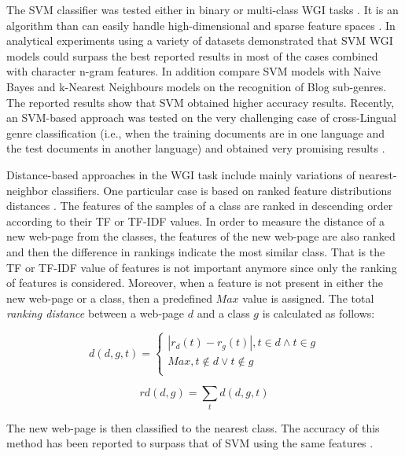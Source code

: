 The SVM classifier was tested either in binary or multi-class WGI tasks \parencite{dai2018fine}. It is an algorithm than can easily handle high-dimensional and sparse feature spaces \parencite{joachims1997probabilistic}. In  analytical experiments using a variety of datasets demonstrated that SVM WGI models could surpass the best reported results in most of the cases combined with character n-gram features. In addition \parencite{virik2017blog} compare SVM models with Naive Bayes and k-Nearest Neighbours models on the recognition of Blog sub-genres. The reported results show that SVM obtained higher accuracy results. Recently, an SVM-based approach was tested on the very challenging case of cross-Lingual genre classification (i.e., when the training documents are in one language and the test documents in another language) and obtained very promising results \parencite{nguyen2019cross}. 

Distance-based approaches in the WGI task include mainly variations of nearest-neighbor classifiers. One particular case is based on ranked feature distributions distances \parencite{waltinger2010feature}. The features of the samples of a class are ranked in descending order according to their TF or TF-IDF values. In order to measure the distance of a new web-page from the classes, the features of the new web-page are also ranked and then the difference in rankings indicate the most similar class. That is the TF or TF-IDF value of features is not important anymore since only the ranking of features is considered. Moreover, when a feature is not present in either the new web-page or a class, then a predefined $Max$ value is assigned. The total \textit{ranking distance} between a web-page $d$ and a class $g$ is calculated as follows:

\begin{equation}\label{eq:ranking_distance}
	d(d,g,t) =
      \begin{cases}
      	| r_{d}(t) - r_{g}(t) |, t \in d \wedge t \in g  \\
        Max, t \notin d \vee t \notin g \\ 
       \end{cases}
\end{equation}

\begin{equation}\label{eq:ranking_distance_sum}
	rd(d,g) = \sum_{t} d(d,g,t)
\end{equation}

The new web-page is then classified to the nearest class. The accuracy of this method has been reported to surpass that of SVM using the same features \parencite{waltinger2010feature}.

